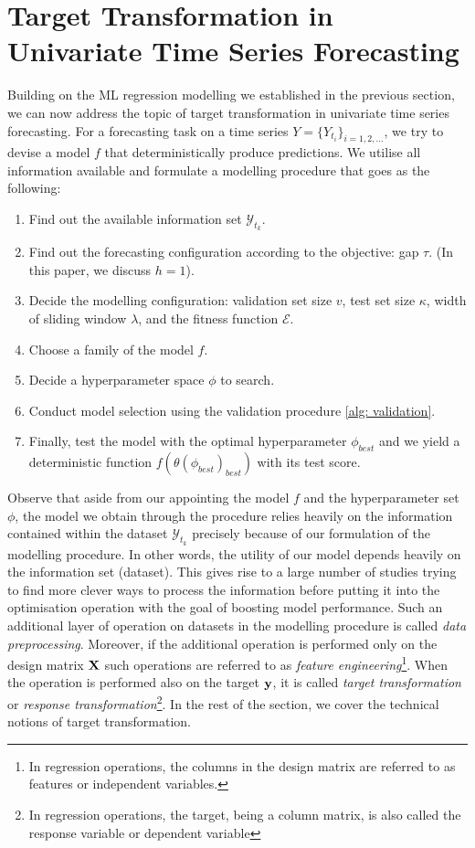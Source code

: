\section{Target Transformation in Univariate Time Series Forecasting}

Building on the ML regression modelling we established in the previous section, we can now address the topic of target transformation in univariate time series forecasting. For a forecasting task on a time series $Y = \{ Y_{t_i} \}_{i = 1, 2, \ldots}$, we try to devise a model $f$ that deterministically produce predictions. We utilise all information available and formulate a modelling procedure that goes as the following:
\begin{enumerate}
    \item Find out the available information set $\mathcal{Y}_{t_k}$.
    \item Find out the forecasting configuration according to the objective: gap $\tau$. (In this paper, we discuss $h=1$).
    \item Decide the modelling configuration: validation set size $v$, test set size $\kappa$, width of sliding window $\lambda$, and the fitness function $\mathcal{E}$.
    \item Choose a family of the model $f$.
    \item Decide a hyperparameter space $\phi$ to search.
    \item Conduct model selection using the validation procedure \ref{alg: validation}.
    \item Finally, test the model with the optimal hyperparameter $\phi_{best}$ and we yield a deterministic function $f(\theta(\phi_{best})_{best})$ with its test score.
\end{enumerate}
Observe that aside from our appointing the model $f$ and the hyperparameter set $\phi$, the model we obtain through the procedure relies heavily on the information contained within the dataset $\mathcal{Y}_{t_k}$ precisely because of our formulation of the modelling procedure. In other words, the utility of our model depends heavily on the information set (dataset). This gives rise to a large number of studies trying to find more clever ways to process the information before putting it into the optimisation operation with the goal of boosting model performance. Such an additional layer of operation on datasets in the modelling procedure is called \textit{data preprocessing}. Moreover, if the additional operation is performed only on the design matrix $\mathbf{X}$ such operations are referred to as \textit{feature engineering}\footnote{In regression operations, the columns in the design matrix are referred to as features or independent variables.}. When the operation is performed also on the target $\mathbf{y}$, it is called \textit{target transformation} or \textit{response transformation}\footnote{In regression operations, the target, being a column matrix, is also called the response variable or dependent variable}. In the rest of the section, we cover the technical notions of target transformation.

